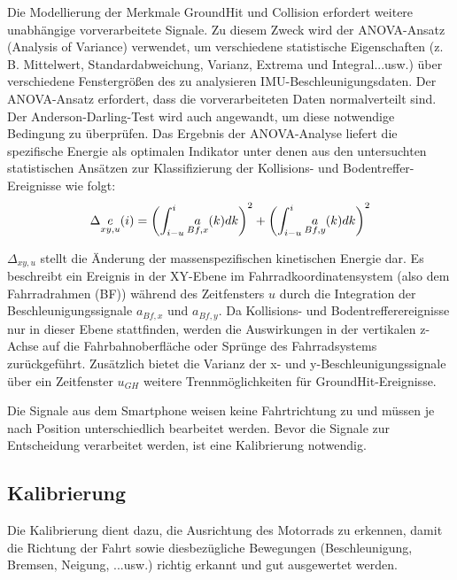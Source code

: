 Die Modellierung der Merkmale GroundHit und Collision erfordert weitere unabhängige vorverarbeitete Signale. Zu diesem Zweck wird der ANOVA-Ansatz (Analysis of Variance) verwendet, um verschiedene statistische Eigenschaften (z. B. Mittelwert, Standardabweichung, Varianz, Extrema und Integral...usw.) über verschiedene Fenstergrößen des zu analysieren IMU-Beschleunigungsdaten. Der ANOVA-Ansatz erfordert, dass die vorverarbeiteten Daten normalverteilt sind. Der Anderson-Darling-Test wird auch angewandt, um diese notwendige Bedingung zu überprüfen. Das Ergebnis der ANOVA-Analyse liefert die spezifische Energie als optimalen Indikator unter denen aus den untersuchten statistischen Ansätzen zur Klassifizierung der Kollisions- und Bodentreffer-Ereignisse wie folgt:
\begin{equation}
	\centering
	\begin{gathered}
		\Delta\underset{xy,u}{e} (i) = \left(\int_{i-u}^{i} \underset{Bf,x}{a}(k) dk \right)^2 + \left(\int_{i-u}^{i} \underset{Bf,y}{a}(k) dk \right)^2
		\label{gl:EnergieFormel_JanPaper}
	\end{gathered}
\end{equation}


$\Delta_{xy,u}$ stellt die Änderung der massenspezifischen kinetischen Energie dar. Es beschreibt ein Ereignis in der XY-Ebene im Fahrradkoordinatensystem (also dem Fahrradrahmen (BF)) während des Zeitfensters $u$ durch die Integration der Beschleunigungssignale $a_{Bf,x}$ und $a_{Bf,y}$. Da Kollisions- und Bodentrefferereignisse nur in dieser Ebene stattfinden, werden die Auswirkungen in der vertikalen z-Achse auf die Fahrbahnoberfläche oder Sprünge des Fahrradsystems zurückgeführt. Zusätzlich bietet die Varianz der x- und y-Beschleunigungssignale über ein Zeitfenster $u_{GH}$ weitere Trennmöglichkeiten für GroundHit-Ereignisse. \citep{Schneeclassification2021}

Die Signale aus dem Smartphone weisen keine Fahrtrichtung zu und müssen je nach Position unterschiedlich bearbeitet werden. Bevor die Signale zur Entscheidung verarbeitet werden, ist eine Kalibrierung notwendig.


\subsection{Kalibrierung}
Die Kalibrierung dient dazu, die Ausrichtung des Motorrads zu erkennen, damit die Richtung der Fahrt sowie diesbezügliche Bewegungen (Beschleunigung, Bremsen, Neigung, ...usw.) richtig erkannt und gut ausgewertet werden.\\

